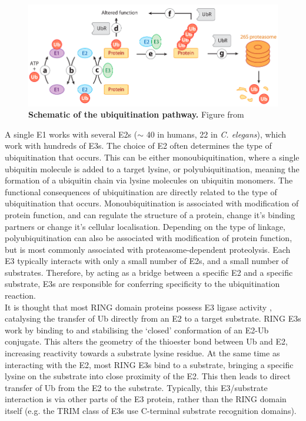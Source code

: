 \documentclass[12pt]{"report"}
\newcommand{\mycaption}[2]{\caption[#1]{\textbf{#1.} #2}}
\begin{document}
\begin{figure}[!h]
\includegraphics[scale=0.95]{ubiquitination_pathway}
\setlength{\abovecaptionskip}{20pt}
\centering
\mycaption{Schematic of the ubiquitination pathway}{Figure from \cite{Deshaies2009}}
\label{fig:ubiquitination_pathway}
\end{figure}

A single E1 works with several E2s ($\sim$ 40 in humans, 22 in \textit{C. elegans}), which work with hundreds of E3s. The choice of E2 often determines the type of ubiquitination that occurs. This can be either monoubiquitination, where a single ubiquitin molecule is added to a target lysine, or polyubiquitination, meaning the formation of a ubiquitin chain via lysine molecules on ubiquitin monomers. The functional consequences of ubiquitination are directly related to the type of ubiquitination that occurs. Monoubiquitination is associated with modification of protein function, and can regulate the structure of a protein, change it's binding partners or change it's cellular localisation. Depending on the type of linkage, polyubiquitination can also be associated with modification of protein function, but is most commonly associated with proteasome-dependent proteolysis. Each E3 typically interacts with only a small number of E2s, and a small number of substrates. Therefore, by acting as a bridge between a specific E2 and a specific substrate, E3s are responsible for conferring specificity to the ubiquitination reaction. \\

It is thought that most RING domain proteins possess E3 ligase activity \citep{Deshaies2009}, catalysing the transfer of Ub directly from an E2 to a target substrate. RING E3s work by binding to and stabilising the `closed' conformation of an E2-Ub conjugate. This alters the geometry of the thioester bond between Ub and E2, increasing reactivity towards a substrate lysine residue. At the same time as interacting with the E2, most RING E3s bind to a substrate, bringing a specific lysine on the substrate into close proximity of the E2. This then leads to direct transfer of Ub from the E2 to the substrate. Typically, this E3/substrate interaction is via other parts of the E3 protein, rather than the RING domain itself (e.g. the TRIM class of E3s use C-terminal substrate recognition domains).\\
\end{document}
